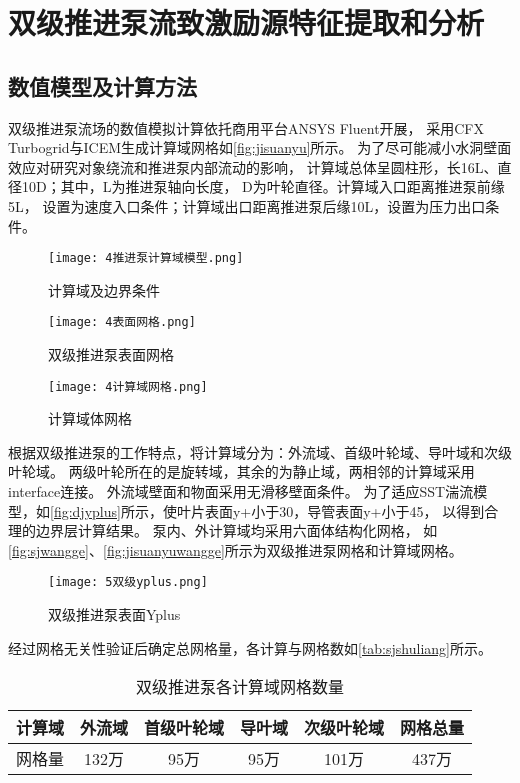\section{双级推进泵流致激励源特征提取和分析}
\subsection{数值模型及计算方法}
双级推进泵流场的数值模拟计算依托商用平台ANSYS Fluent开展，
采用CFX Turbogrid与ICEM生成计算域网格如\autoref{fig:jisuanyu}所示。
为了尽可能减小水洞壁面效应对研究对象绕流和推进泵内部流动的影响，
计算域总体呈圆柱形，长16L、直径10D；其中，L为推进泵轴向长度，
D为叶轮直径。计算域入口距离推进泵前缘5L，
设置为速度入口条件；计算域出口距离推进泵后缘10L，设置为压力出口条件。
\begin{figure}[htbp]
    \centering
    \texttt{[image: 4推进泵计算域模型.png]}
    \caption{\label{fig:jisuanyu}计算域及边界条件}
\end{figure}
\begin{figure}[htbp]
    \centering
    \texttt{[image: 4表面网格.png]}
    \caption{\label{fig:sjwangge}双级推进泵表面网格}
\end{figure}
\begin{figure}[htbp]
    \centering
    \texttt{[image: 4计算域网格.png]}
    \caption{\label{fig:jisuanyuwangge}计算域体网格}
\end{figure}

根据双级推进泵的工作特点，将计算域分为：外流域、首级叶轮域、导叶域和次级叶轮域。
两级叶轮所在的是旋转域，其余的为静止域，两相邻的计算域采用interface连接。
外流域壁面和物面采用无滑移壁面条件。
为了适应SST湍流模型，如\autoref{fig:djyplus}所示，使叶片表面y+小于30，导管表面y+小于45，
以得到合理的边界层计算结果。
泵内、外计算域均采用六面体结构化网格，
如\autoref{fig:sjwangge}、\autoref{fig:jisuanyuwangge}所示为双级推进泵网格和计算域网格。
\begin{figure}[htbp]
    \centering
    \texttt{[image: 5双级yplus.png]}
    \caption{\label{fig:djyplus}双级推进泵表面Yplus}
\end{figure}

经过网格无关性验证后确定总网格量，各计算与网格数如\autoref{tab:sjshuliang}所示。
\begin{table}[htbp]
    \centering
    \caption{\label{tab:sjshuliang}双级推进泵各计算域网格数量}
    \begin{tabular}{cccccc}
        \toprule
        计算域 & 外流域 & 首级叶轮域 & 导叶域 & 次级叶轮域 & 网格总量 \\
        \midrule
        网格量 & 132万 & 95万 & 95万 & 101万 & 437万 \\
        \bottomrule
    \end{tabular}
\end{table}

